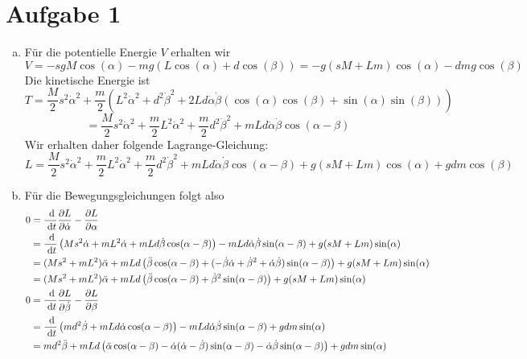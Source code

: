 \documentclass{article}
\theoremstyle{definition}
\begin{document}
\section*{Aufgabe 1}
\begin{enumerate}[(a)]
    \item Für die potentielle Energie $V$ erhalten wir
    $$V  = -s g M \cos(\alpha) - m g (L \cos(\alpha) + d\cos(\beta)) = -g(sM + Lm)\cos(\alpha) - dmg\cos(\beta)$$
    Die kinetische Energie ist
    $$T = \frac{M}{2}s^2\dot \alpha^2 + \frac{m}{2}\left(L^2\dot \alpha^2 + d^2\dot \beta^2 + 2Ld\dot \alpha\dot \beta (\cos(\alpha)\cos(\beta) + \sin(\alpha)\sin(\beta))\right)$$
    $$= \frac{M}{2}s^2\dot \alpha^2 + \frac{m}{2}L^2 \dot \alpha^2 + \frac{m}{2}d^2 \dot \beta^2 + mLd\dot \alpha\dot \beta \cos(\alpha - \beta)$$
    Wir erhalten daher folgende Lagrange-Gleichung:
    $$L = \frac{M}{2}s^2\dot \alpha^2 + \frac{m}{2}L^2 \dot \alpha^2 + \frac{m}{2}d^2 \dot \beta^2 + mLd\dot \alpha\dot \beta \cos(\alpha - \beta)+g(sM + Lm)\cos(\alpha) + gdm\cos(\beta)$$
    \item Für die Bewegungsgleichungen folgt also
    \begin{align*}
        0 &= \frac{\d }{\d t}\frac{\partial L }{\partial \dot \alpha} - \frac{\partial L}{\partial \alpha}\\
        &= \frac{\d }{\d t} \left(Ms^2 \dot \alpha + mL^2 \dot \alpha + mLd\dot \beta \cos(\alpha - \beta)\right) - mLd\dot \alpha\dot \beta \sin(\alpha - \beta)+ g(sM + Lm)\sin(\alpha)\\
        &= (Ms^2 + mL^2)\ddot \alpha + mLd\left(\ddot \beta\cos(\alpha - \beta) + (- \dot \beta \dot \alpha + \dot \beta^2+ \dot\alpha \dot \beta) \sin(\alpha - \beta)\right)+ g(sM + Lm)\sin(\alpha)\\
        &= (Ms^2 + mL^2)\ddot \alpha + mLd\left(\ddot \beta\cos(\alpha - \beta) + \dot \beta^2 \sin(\alpha - \beta)\right)+ g(sM + Lm)\sin(\alpha)\\
        0 &= \frac{\d }{\d t}\frac{\partial L }{\partial \dot \beta} - \frac{\partial L}{\partial \beta}\\
        &= \frac{\d }{\d t} \left(md^2\dot \beta + mLd\dot \alpha \cos(\alpha - \beta)\right) - mLd\dot \alpha\dot \beta \sin(\alpha - \beta) + gdm\sin(\alpha)\\
        &= md^2 \ddot \beta + mLd\left(\ddot \alpha \cos(\alpha - \beta) - \dot \alpha (\dot \alpha - \dot \beta)\sin(\alpha - \beta) - \dot \alpha \dot \beta \sin(\alpha - \beta)\right)+ gdm\sin(\alpha)\\

\end{align*}
\end{enumerate}
\end{document}
